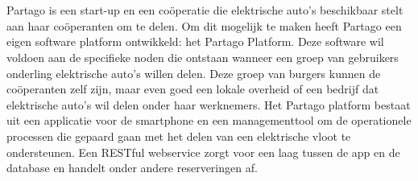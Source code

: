 
\chapter{}
\label{ch:inleiding}

Partago is een start-up en een coöperatie die elektrische auto's beschikbaar stelt aan haar coöperanten om te delen. Om dit mogelijk te maken heeft Partago een eigen software platform ontwikkeld: het Partago Platform. Deze software wil voldoen aan de specifieke noden die ontstaan wanneer een groep van gebruikers onderling elektrische auto's willen delen. Deze groep van burgers kunnen de coöperanten zelf zijn, maar even goed een lokale overheid of een bedrijf dat elektrische auto's wil delen onder haar werknemers. Het Partago platform bestaat uit een applicatie voor de smartphone en een managementtool om de operationele processen die gepaard gaan met het delen van een elektrische vloot te ondersteunen. Een RESTful webservice zorgt voor een laag tussen de app en de database en handelt onder andere reserveringen af.

